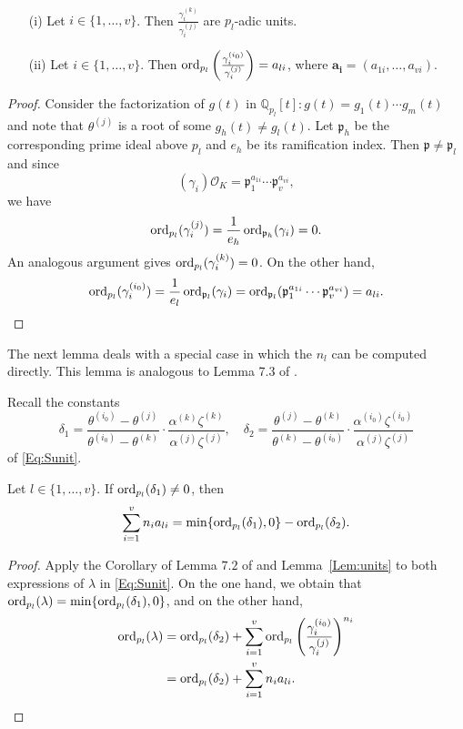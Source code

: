 \begin{lemma} \label{Lem:units} \
\begin{enumerate}
\item[(i)] Let $i \in \{1, \dots, v\}$. Then $\frac{\gamma_i^{(k)}}{\gamma_i^{(j)}}$ are $p_l$-adic units. 
\item[(ii)] Let $i \in \{1, \dots, v\}$. Then $\operatorname{ord}_{p_l}\left(\frac{\gamma_i^{(i_0)}}{\gamma_i^{(j)}}\right) = a_{li}$, where $\mathbf{a_i} = (a_{1i}, \dots, a_{vi})$. 
\end{enumerate}
\end{lemma}

\begin{proof}
Consider the factorization of $g(t)$ in $\mathbb{Q}_{p_l}[t]: g(t) = g_1(t) \cdots g_m(t)$ and note that $\theta^{(j)}$ is a root of some $g_h(t) \neq g_l(t)$. Let $\mathfrak{p}_h$ be the corresponding prime ideal above $p_l$ and $e_h$ be its ramification index. Then $\mathfrak{p} \neq \mathfrak{p}_l$ and since 
\[(\gamma_i)\mathcal{O}_K = \mathfrak{p}_1^{a_{1i}} \cdots \mathfrak{p}_v^{a_{vi}},\]
we have 
\[\operatorname{ord}_{p_l}(\gamma_i^{(j)}) = \frac{1}{e_h}\operatorname{ord}_{\mathfrak{p}_h}(\gamma_i) = 0.\]
An analogous argument gives $\operatorname{ord}_{p_l}(\gamma_i^{(k)}) = 0$. On the other hand, 
\[\operatorname{ord}_{p_l}(\gamma_i^{(i_0)}) = \frac{1}{e_l}\operatorname{ord}_{\mathfrak{p}_l}(\gamma_i) = \operatorname{ord}_{\mathfrak{p}_l}(\mathfrak{p}_1^{a_{1i}} \cdots \mathfrak{p}_v^{a_{vi}}) = a_{li}.\]

\end{proof}

The next lemma deals with a special case in which the $n_l$ can be computed directly. This lemma is analogous to Lemma 7.3 of \cite{TW3}. 

Recall the constants
\[\delta_1 = \frac{\theta^{(i_0)} - \theta^{(j)}}{\theta^{(i_0)} - \theta^{(k)}}\cdot\frac{\alpha^{(k)}\zeta^{(k)}}{\alpha^{(j)}\zeta^{(j)}}, \quad \delta_2 = \frac{\theta^{(j)} - \theta^{(k)}}{\theta^{(k)} - \theta^{(i_0)}}\cdot \frac{\alpha^{(i_0)}\zeta^{(i_0)}}{\alpha^{(j)}\zeta^{(j)}}\]
of \eqref{Eq:Sunit}.
\begin{lemma}\label{Lem:del1}
Let $l \in \{1, \dots, v\}$. If $\operatorname{ord}_{p_l}(\delta_1) \neq 0$, then 
\[ \sum_{i = 1}^v n_ia_{li} = \min\{\operatorname{ord}_{p_l}(\delta_1), 0\} - \operatorname{ord}_{p_l}(\delta_2).\]
\end{lemma}

\begin{proof}
Apply the Corollary of Lemma $7.2$ of \cite{TW3} and Lemma~\ref{Lem:units} to both expressions of $\lambda$ in \eqref{Eq:Sunit}. On the one hand, we obtain that $\operatorname{ord}_{p_l}(\lambda) = \min\{\operatorname{ord}_{p_l}(\delta_1), 0\}$, and on the other hand, 
\[\begin{split}
\operatorname{ord}_{p_l}(\lambda)
& = \operatorname{ord}_{p_l}(\delta_2) + \sum_{i = 1}^v \operatorname{ord}_{p_l}\left( \frac{\gamma_i^{(i_0)}}{\gamma_i^{(j)}}\right)^{n_i}\\
& = \operatorname{ord}_{p_l}(\delta_2) + \sum_{i = 1}^v n_ia_{li}.
\end{split}\]
\end{proof}

